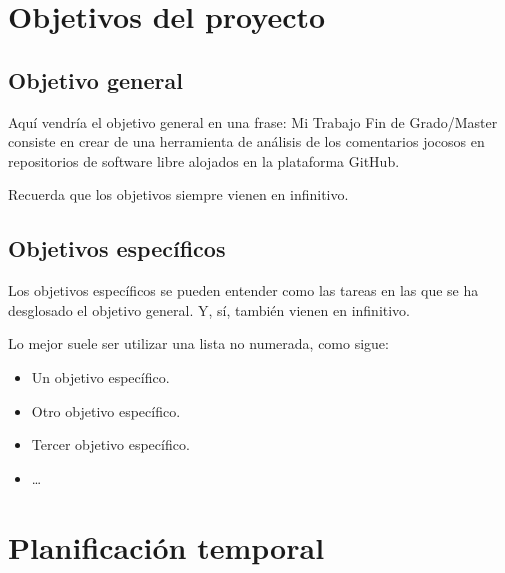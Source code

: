 \documentclass[a4paper, 12pt]{book}
\begin{document}
\section{Objetivos del proyecto}
\label{sec:objetivos}

\subsection{Objetivo general} %
\label{sec:objetivo-general} %


Aquí vendría el objetivo general en una frase:
Mi Trabajo Fin de Grado/Master consiste en crear de una herramienta de análisis de los comentarios jocosos en repositorios de software libre alojados en la plataforma GitHub.

Recuerda que los objetivos siempre vienen en infinitivo.


\subsection{Objetivos específicos}
\label{sec:objetivos-especificos}

Los objetivos específicos se pueden entender como las tareas en las que se ha desglosado el objetivo general. Y, sí, también vienen en infinitivo.

Lo mejor suele ser utilizar una lista no numerada, como sigue:

    \begin{itemize}
        \item Un objetivo específico.
        \item Otro objetivo específico.
        \item Tercer objetivo específico.
        \item \ldots
    \end{itemize}

\section{Planificación temporal}
\label{sec:planificacion-temporal}
\end{document}
